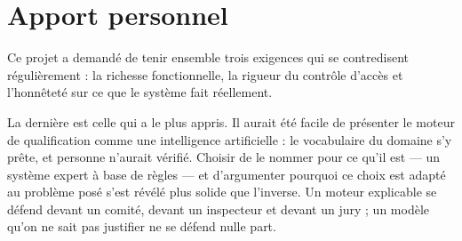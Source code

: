 \section*{Apport personnel}

Ce projet a demandé de tenir ensemble trois exigences qui se contredisent
régulièrement : la richesse fonctionnelle, la rigueur du contrôle d'accès et
l'honnêteté sur ce que le système fait réellement.

La dernière est celle qui a le plus appris. Il aurait été facile de présenter le moteur
de qualification comme une intelligence artificielle : le vocabulaire du domaine s'y
prête, et personne n'aurait vérifié. Choisir de le nommer pour ce qu'il est — un système
expert à base de règles — et d'argumenter pourquoi ce choix est adapté au problème posé
s'est révélé plus solide que l'inverse. Un moteur explicable se défend devant un comité,
devant un inspecteur et devant un jury ; un modèle qu'on ne sait pas justifier ne se
défend nulle part.
